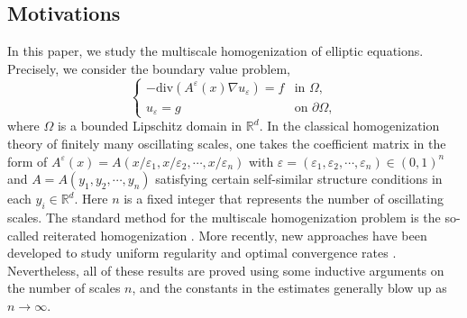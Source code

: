 \documentclass[reqno,12pt]{amsart} %
\theoremstyle{definition}
\theoremstyle{remark}
\numberwithin{equation}{section}
\newcommand{\R}{\mathbb{R}}
\newcommand{\e}{\varepsilon}
\begin{document}
\subsection{Motivations}
In this paper, we study the multiscale homogenization of elliptic equations. Precisely, we consider the boundary value problem,
\begin{equation}\label{eq_infinite}
    \begin{cases}
        -\mathrm{div}(A^{\varepsilon}(x)\nabla u_\varepsilon)=f&\text{in }\Omega,\\
        u_\varepsilon=g& \text{on }\partial\Omega,
   \end{cases}
\end{equation}
where $\Omega$ is a bounded Lipschitz domain in $\R^d$. In the classical homogenization theory of finitely many oscillating scales, one takes the coefficient matrix in the form of $A^\e(x) = A(x/\e_1, x/\e_2,\cdots, x/\e_n)$ with $\e = (\e_1, \e_2,\cdots, \e_n) \in (0,1)^n$ and $A = A(y_1,y_2,\cdots, y_n)$ satisfying certain self-similar structure conditions in each $y_i \in \R^d$. Here $n$ is a fixed integer that represents the number of oscillating scales. 
The standard method for the multiscale homogenization problem is the so-called reiterated homogenization \cite{Bensoussan1978,Allaire1996Multiscale, LLPW01, Niu20_reiterated}. More recently, new approaches have been developed to study uniform regularity \cite{NZ23, NZ24} and optimal convergence rates \cite{Niu25_Optimal}. Nevertheless, all of these results are proved using some inductive arguments on the number of scales $n$, and the constants in the estimates generally blow up as $n \to \infty$.
\end{document}
